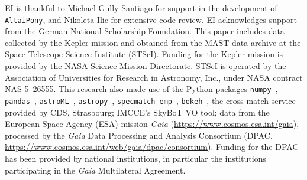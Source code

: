 \documentclass{aa}
\begin{document}
\begin{acknowledgements}
EI is thankful to Michael Gully-Santiago for support in the development of \texttt{AltaiPony}, and Nikoleta Ilic for extensive code review. EI acknowledges support from the German National Scholarship Foundation.
This paper includes data collected by the Kepler mission and obtained from the MAST data archive at the Space Telescope Science Institute (STScI). Funding for the Kepler mission is provided by the NASA Science Mission Directorate. STScI is operated by the Association of Universities for Research in Astronomy, Inc., under NASA contract NAS 5–26555.
This research also made use of the Python packages \texttt{numpy}~\citep{numpy2011}, \texttt{pandas}~\citep{pandas2020software,pandas2010}, \texttt{astroML}~\citep{astroML2012, astroML2014}, \texttt{astropy}~\citep{astropy2013}, \texttt{specmatch-emp}~\citep{yee_specmatch_2017}, \texttt{bokeh}~\citep{bokeh}, the cross-match service provided by CDS, Strasbourg; IMCCE's SkyBoT VO tool; data from the European Space Agency (ESA) mission
{\it Gaia} (\url{https://www.cosmos.esa.int/gaia}), processed by the {\it Gaia}
Data Processing and Analysis Consortium (DPAC,
\url{https://www.cosmos.esa.int/web/gaia/dpac/consortium}). Funding for the DPAC
has been provided by national institutions, in particular the institutions
participating in the {\it Gaia} Multilateral Agreement.
\end{acknowledgements}

\end{document}
